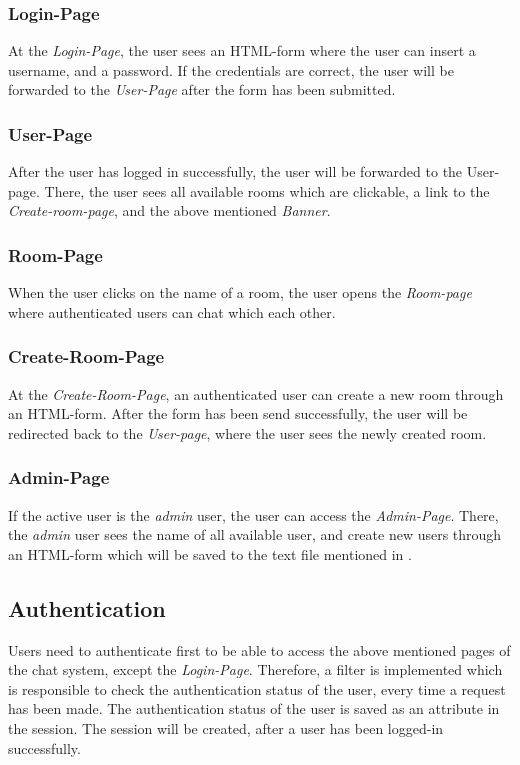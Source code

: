 \subsubsection{Login-Page}\label{subsubsec:02_design_routes_login}
At the \textit{Login-Page}, the user sees an HTML-form where the user can insert a username, and a password. If the credentials are correct, the user will be forwarded to the \textit{User-Page} after the form has been submitted.

\subsubsection{User-Page}\label{subsubsec:02_design_routes_userpage}
After the user has logged in successfully, the user will be forwarded to the User-page. There, the user sees all available rooms which are clickable, a link to the \textit{Create-room-page}, and the above mentioned \textit{Banner}.

\subsubsection{Room-Page}\label{subsubsec:02_design_routes_room}
When the user clicks on the name of a room, the user opens the \textit{Room-page} where authenticated users can chat which each other.

\subsubsection{Create-Room-Page}\label{subsubsec:02_design_routes_createroom}
At the \textit{Create-Room-Page}, an authenticated user can create a new room through an HTML-form. After the form has been send successfully, the user will be redirected back to the \textit{User-page}, where the user sees the newly created room.

\subsubsection{Admin-Page}\label{subsubsec:02_design_routes_admin}
If the active user is the \textit{admin} user, the user can access the \textit{Admin-Page}. There, the \textit{admin} user sees the name of all available user, and create new users through an HTML-form which will be saved to the text file mentioned in .


\subsection{Authentication}\label{subsec:02_design_authentication}
Users need to authenticate first to be able to access the above mentioned pages of the chat system, except the \textit{Login-Page}. Therefore, a filter is implemented which is responsible to check the authentication status of the user, every time a request has been made.
The authentication status of the user is saved as an attribute in the session. The session will be created, after a user has been logged-in successfully.


